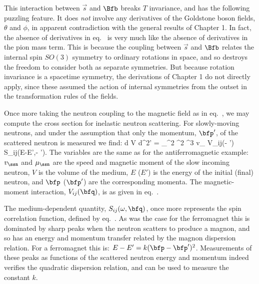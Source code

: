 \documentclass[12pt,epsf]{report}
\begin{document}
This interaction between $\vec s$ and $\Bfb$ breaks $T$
invariance, and has the following puzzling feature. It does
{\em not} involve any derivatives of the Goldstone boson
fields, 
$\theta$ and $\phi$, in apparent contradiction with the
general results of Chapter 1. In fact, the absence of
derivatives in 
eq.~ is very much like the
absence of derivatives in the pion mass term. This is
because the coupling between $\vec s$ and $\Bfb$ relates
the internal spin $SO(3)$ symmetry to ordinary rotations in
space, and so destroys the freedom to consider both as
separate symmetries. But because rotation invariance is a
spacetime symmetry, the derivations of Chapter 1 do not
directly apply, since these assumed the action of internal
symmetries from the outset in the transformation rules of
the fields.

Once more taking the neutron coupling to the magnetic field
as in eq.~, we may compute the cross
section for inelastic neutron scattering. For slowly-moving
neutrons, and under the assumption that only the momentum,
$\bfp'$, of the scattered neutron is measured we find:
%
\eq
\label{ferrocrosssection}
{d \sigma \over V d^2\bfp'} = 
{\mu_\ssn^2 \mu^2  \pi^3 v_\ssn} \;
V_{ij}(\bfp - \bfp') \; S_{ij}(E-E',\bfp - \bfp').  \eeq
%
The variables are the same as for the antiferromagnetic
example: $v_\ssn$ and $\mu_\ssn$ are the speed and magnetic
moment of the slow incoming neutron, $V$ is the volume of
the medium, $E$ ($E'$) is the energy of the initial (final)
neutron, and $\bfp$ 
($\bfp'$) are the corresponding momenta. The
magnetic-moment interaction, $V_{ij}(\bfq)$, is as given in 
eq.~.

The medium-dependent quantity, $S_{ij}(\omega,\bfq)$, once
more represents the spin correlation function, defined by 
eq.~. As was the case for the ferromagnet
this is dominated by sharp peaks when the neutron scatters
to produce a magnon, and so has an energy and momentum
transfer related by the magnon dispersion relation. For a
ferromagnet this is: $E - E' = k (\bfp - \bfp')^2$.
Measurements of these peaks as functions of the scattered
neutron energy and momentum indeed verifies the quadratic
dispersion relation, and can be used to measure the
constant $k$.
\end{document}
